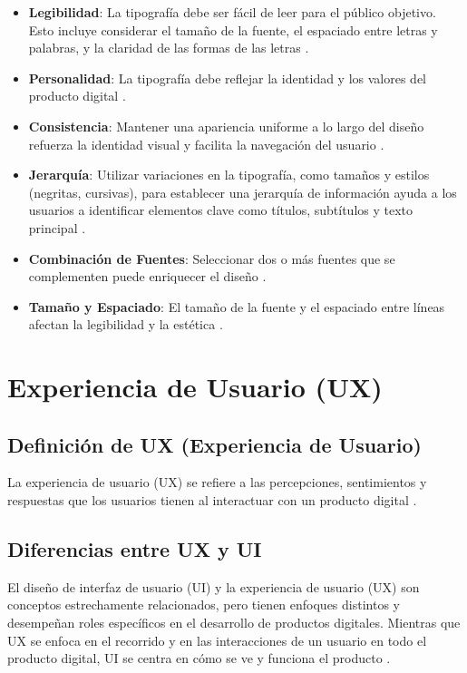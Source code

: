 \begin{itemize}
    \item \textbf{Legibilidad}: La tipografía debe ser fácil de leer para el público objetivo. Esto incluye considerar el tamaño de la fuente, el espaciado entre letras y palabras, y la claridad de las formas de las letras \cite{CamaraSevilla2023}.
    \item \textbf{Personalidad}: La tipografía debe reflejar la identidad y los valores del producto digital \cite{CamaraSevilla2023}.
    \item \textbf{Consistencia}: Mantener una apariencia uniforme a lo largo del diseño refuerza la identidad visual y facilita la navegación del usuario \cite{CamaraSevilla2023}.
    \item \textbf{Jerarquía}: Utilizar variaciones en la tipografía, como tamaños y estilos (negritas, cursivas), para establecer una jerarquía de información ayuda a los usuarios a identificar elementos clave como títulos, subtítulos y texto principal \cite{CamaraSevilla2023}.
    \item \textbf{Combinación de Fuentes}: Seleccionar dos o más fuentes que se complementen puede enriquecer el diseño \cite{CamaraSevilla2023}.
    \item \textbf{Tamaño y Espaciado}: El tamaño de la fuente y el espaciado entre líneas afectan la legibilidad y la estética \cite{CamaraSevilla2023}.
\end{itemize}

\section{Experiencia de Usuario (UX)}
\subsection{Definición de UX (Experiencia de Usuario)}
La experiencia de usuario (UX) se refiere a las percepciones, sentimientos y respuestas que los usuarios tienen al interactuar con un producto digital \cite{Chacon2024}.

\subsection{Diferencias entre UX y UI}
El diseño de interfaz de usuario (UI) y la experiencia de usuario (UX) son conceptos estrechamente relacionados, pero tienen enfoques distintos y desempeñan roles específicos en el desarrollo de productos digitales. Mientras que UX se enfoca en el recorrido y en las interacciones de un usuario en todo el producto digital, UI se centra en cómo se ve y funciona el producto \cite{Chacon2024}.

